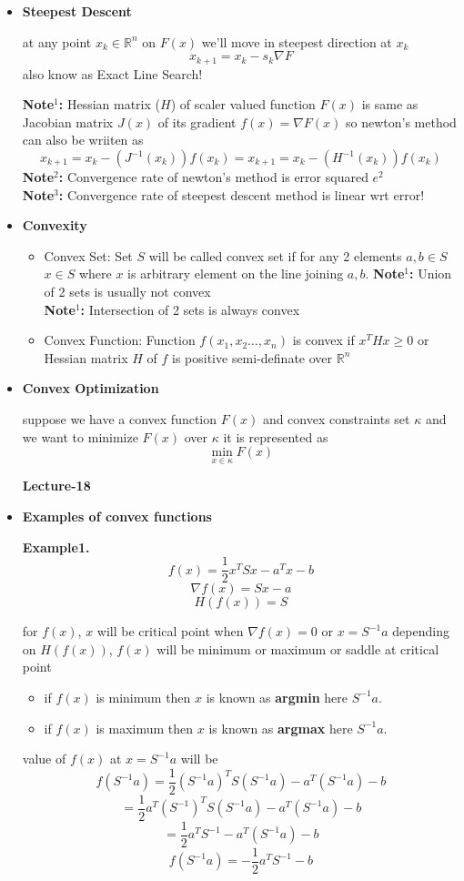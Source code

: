 \documentclass[a4paper]{article}
\numberwithin{equation}{section}
\begin{document}
\begin{itemize}
\item \textbf{Steepest Descent}

at any point $x_k\in \mathbb{R}^n$ on $F(x)$ we'll move in steepest direction at $x_k$
\[\boxed{x_{k+1}=x_k-s_k\nabla F}\]
also know as Exact Line Search!

\textbf{Note$^1$:} Hessian matrix ($H$) of scaler valued function $F(x)$ is same as Jacobian matrix $J(x)$ of its gradient $f(x)=\nabla F(x)$ so newton's method can also be wriiten as 
\[\boxed{x_{k+1}=x_k-(J^{-1}(x_k))f(x_k)=x_{k+1}=x_k-(H^{-1}(x_k))f(x_k)}\]
\textbf{Note$^2$:} Convergence rate of newton's method is error squared $e^2$\\
\textbf{Note$^3$:} Convergence rate of steepest descent method is linear wrt error!

\item \textbf{Convexity}
\begin{itemize}
    \item Convex Set: Set $S$ will be called convex set if for any 2 elements $a,b \in S$ $x \in S$ where $x$ is arbitrary element on the line joining $a,b$.\vspace{4pt}
    \textbf{Note$^1$:} Union of 2 sets is usually not convex\\
    \textbf{Note$^1$:} Intersection of 2 sets is always convex
    \item Convex Function: Function $f(x_1,x_2\dots,x_n)$ is convex if $x^THx \geq0$ or Hessian matrix $H$ of $f$ is positive semi-definate over $\mathbb{R}^n$
\end{itemize}
\item \textbf{Convex Optimization}

suppose we have a convex function $F(x)$ and convex constraints set $\kappa$ and we want to minimize $F(x)$ over $\kappa$ it is represented as 
\[\min_{x\in \kappa}F(x)\]

\begin{center}
    \textbf{\Huge{Lecture-18}}
\end{center}
\item \textbf{Examples of convex functions}

\textbf{Example1.}
\[f(x)=\frac{1}{2}x^TSx-a^Tx-b\]
\[\nabla f(x)=Sx-a\]
\[H(f(x))=S\]

for $f(x)$, $x$ will be critical point when $\nabla f(x)=0$ or $x=S^{-1}a$ depending on $H(f(x))$, $f(x)$ will be minimum or maximum or saddle at critical point
\begin{itemize}
    \item if $f(x)$ is minimum then $x$ is known as \textbf{argmin} here $S^{-1}a$.
    \item if $f(x)$ is maximum then $x$ is known as \textbf{argmax} here $S^{-1}a$.
\end{itemize}
value of $f(x)$ at $x=S^{-1}a$ will be 
\[f(S^{-1}a)=\frac{1}{2}(S^{-1}a)^TS(S^{-1}a)-a^T(S^{-1}a)-b\]
\[=\frac{1}{2}a^T(S^{-1})^TS(S^{-1}a)-a^T(S^{-1}a)-b\]
\[=\frac{1}{2}a^TS^{-1}-a^T(S^{-1}a)-b\]
\[\boxed{f(S^{-1}a)=-\frac{1}{2}a^TS^{-1}-b}\]


\end{itemize}
\end{document}
